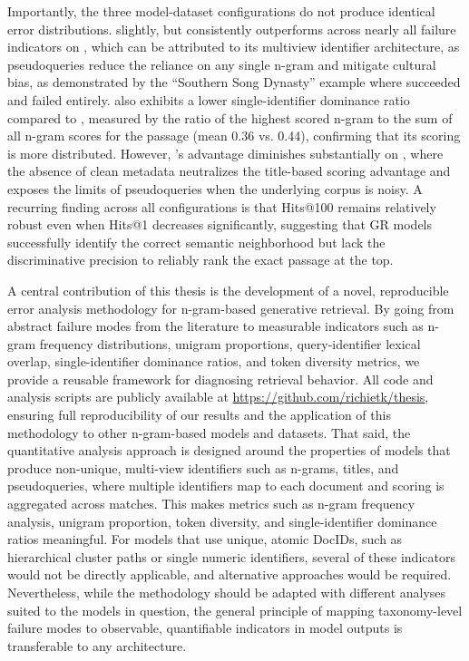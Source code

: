 Importantly, the three model-dataset configurations do not produce identical error distributions.  slightly, but consistently outperforms  across nearly all failure indicators on , which can be attributed to its multiview identifier architecture, as pseudoqueries reduce the reliance on any single n-gram and mitigate cultural bias, as demonstrated by the ``Southern Song Dynasty'' example where  succeeded and  failed entirely.  also exhibits a lower single-identifier dominance ratio compared to , measured by the ratio of the highest scored n-gram to the sum of all n-gram scores for the passage (mean 0.36 vs. 0.44), confirming that its scoring is more distributed. However, 's advantage diminishes substantially on , where the absence of clean metadata neutralizes the title-based scoring advantage and exposes the limits of pseudoqueries when the underlying corpus is noisy. A recurring finding across all configurations is that Hits@100 remains relatively robust even when Hits@1 decreases significantly, suggesting that GR models successfully identify the correct semantic neighborhood but lack the discriminative precision to reliably rank the exact passage at the top.

A central contribution of this thesis is the development of a novel, reproducible error analysis methodology for n-gram-based generative retrieval. By going from abstract failure modes from the literature to measurable indicators such as n-gram frequency distributions, unigram proportions, query-identifier lexical overlap, single-identifier dominance ratios, and token diversity metrics, we provide a reusable framework for diagnosing retrieval behavior. All code and analysis scripts are publicly available at \url{https://github.com/richietk/thesis}, ensuring full reproducibility of our results and the application of this methodology to other n-gram-based  models and datasets. That said, the quantitative analysis approach is designed around the properties of models that produce non-unique, multi-view identifiers such as n-grams, titles, and pseudoqueries, where multiple identifiers map to each document and scoring is aggregated across matches. This makes metrics such as n-gram frequency analysis, unigram proportion, token diversity, and single-identifier dominance ratios meaningful. For  models that use unique, atomic DocIDs, such as hierarchical cluster paths or single numeric identifiers, several of these indicators would not be directly applicable, and alternative approaches would be required. Nevertheless, while the methodology should be adapted with different analyses suited to the models in question, the general principle of mapping taxonomy-level failure modes to observable, quantifiable indicators in model outputs is transferable to any  architecture.
